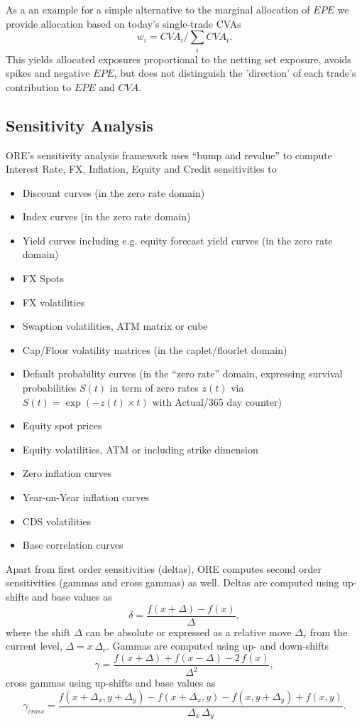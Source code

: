 \documentclass[12pt, a4paper]{article}
\newcommand{\CVA}{\mathit{CVA}}
\newcommand{\EPE}{\mathit{EPE}}
\begin{document}
{\begin{appendix}
\medskip As a an example for a simple alternative to the marginal allocation of $\EPE$ we provide allocation based on
today's single-trade CVAs
$$
w_i = \CVA_i / \sum_i \CVA_i.
$$
This yields allocated exposures proportional to the netting set exposure, avoids spikes and negative $\EPE$, but does
not distinguish the 'direction' of each trade's contribution to $\EPE$ and $\CVA$.

\subsection{Sensitivity Analysis}\label{sec:app_sensi}

ORE's sensitivity analysis framework uses ``bump and revalue'' to compute Interest Rate, FX, Inflation, Equity and Credit sensitivities to
\begin{itemize}
\item Discount curves  (in the zero rate domain)
\item Index curves (in the zero rate domain)
\item Yield curves including e.g. equity forecast yield curves (in the zero rate domain)
\item FX Spots
\item FX volatilities
\item Swaption volatilities, ATM matrix or cube 
\item Cap/Floor volatility matrices (in the caplet/floorlet domain)
\item Default probability curves (in the ``zero rate'' domain, expressing survival probabilities $S(t)$ in term of zero rates $z(t)$ via $S(t)=\exp(-z(t)\times t)$ with Actual/365 day counter)
\item Equity spot prices
\item Equity volatilities, ATM or including strike dimension 
\item Zero inflation curves
\item Year-on-Year inflation curves
\item CDS volatilities
\item Base correlation curves
\end{itemize}

Apart from first order sensitivities (deltas), ORE computes second order sensitivities (gammas and cross gammas) as well. Deltas are computed using up-shifts and base values as
$$
\delta = \frac{f(x+\Delta)-f(x)}{\Delta},
$$ 
where the shift $\Delta$ can be absolute or expressed as a relative move $\Delta_r$ from the current level, $\Delta=x\,\Delta_r$. Gammas are computed using up- and down-shifts
$$
\gamma = \frac{f(x+\Delta)+f(x-\Delta) - 2\,f(x)}{\Delta^2},
$$ 
cross gammas using up-shifts and base values as
$$
\gamma_{cross} = \frac{f(x+\Delta_x,y+\Delta_y)-f(x+\Delta_x,y) -f(x,y+\Delta_y) + f(x,y)}{\Delta_x\,\Delta_y}.
$$ 


\end{appendix}}
\end{document}
